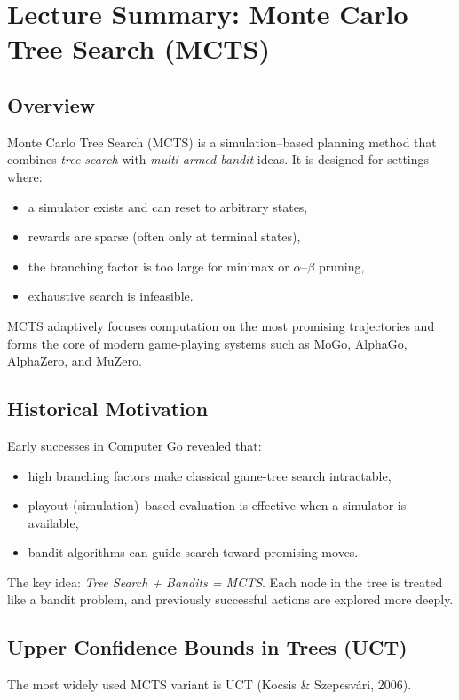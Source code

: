 \documentclass[12pt]{article}
\begin{document}
\psetheader %

\section*{Lecture Summary: Monte Carlo Tree Search (MCTS)}

\subsection*{Overview}
Monte Carlo Tree Search (MCTS) is a simulation–based planning method that combines
\emph{tree search} with \emph{multi-armed bandit} ideas.
It is designed for settings where:
\begin{itemize}
		\item a simulator exists and can reset to arbitrary states,
		\item rewards are sparse (often only at terminal states),
		\item the branching factor is too large for minimax or $\alpha$–$\beta$ pruning,
		\item exhaustive search is infeasible.
\end{itemize}
MCTS adaptively focuses computation on the most promising trajectories and forms the
core of modern game-playing systems such as MoGo, AlphaGo, AlphaZero, and MuZero.

\subsection*{Historical Motivation}
Early successes in Computer Go revealed that:
\begin{itemize}
		\item high branching factors make classical game-tree search intractable,
		\item playout (simulation)–based evaluation is effective when a simulator is available,
		\item bandit algorithms can guide search toward promising moves.
\end{itemize}
The key idea: \emph{Tree Search + Bandits = MCTS}.
Each node in the tree is treated like a bandit problem, and previously successful
actions are explored more deeply.

\subsection*{Upper Confidence Bounds in Trees (UCT)}
The most widely used MCTS variant is UCT (Kocsis \& Szepesvári, 2006).
\end{document}
